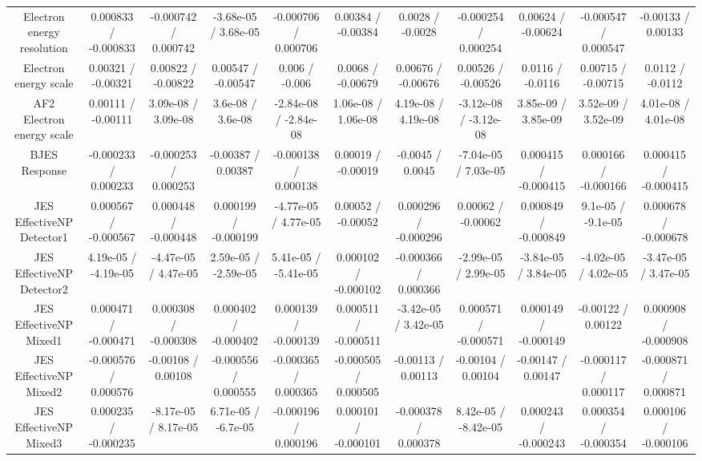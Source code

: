 \begin{table}[htbp]
\begin{center}
\begin{tabular}{|c|c|c|c|c|c|c|c|c|c|c|}
  Electron energy resolution & 0.000833 / -0.000833 & -0.000742 / 0.000742 & -3.68e-05 / 3.68e-05 & -0.000706 / 0.000706 & 0.00384 / -0.00384 & 0.0028 / -0.0028 & -0.000254 / 0.000254 & 0.00624 / -0.00624 & -0.000547 / 0.000547 & -0.00133 / 0.00133 \\ 
  Electron energy scale & 0.00321 / -0.00321 & 0.00822 / -0.00822 & 0.00547 / -0.00547 & 0.006 / -0.006 & 0.0068 / -0.00679 & 0.00676 / -0.00676 & 0.00526 / -0.00526 & 0.0116 / -0.0116 & 0.00715 / -0.00715 & 0.0112 / -0.0112 \\ 
  AF2 Electron energy scale & 0.00111 / -0.00111 & 3.09e-08 / 3.09e-08 & 3.6e-08 / 3.6e-08 & -2.84e-08 / -2.84e-08 & 1.06e-08 / 1.06e-08 & 4.19e-08 / 4.19e-08 & -3.12e-08 / -3.12e-08 & 3.85e-09 / 3.85e-09 & 3.52e-09 / 3.52e-09 & 4.01e-08 / 4.01e-08 \\ 
  BJES Response & -0.000233 / 0.000233 & -0.000253 / 0.000253 & -0.00387 / 0.00387 & -0.000138 / 0.000138 & 0.00019 / -0.00019 & -0.0045 / 0.0045 & -7.04e-05 / 7.03e-05 & 0.000415 / -0.000415 & 0.000166 / -0.000166 & 0.000415 / -0.000415 \\ 
  JES EffectiveNP Detector1 & 0.000567 / -0.000567 & 0.000448 / -0.000448 & 0.000199 / -0.000199 & -4.77e-05 / 4.77e-05 & 0.00052 / -0.00052 & 0.000296 / -0.000296 & 0.00062 / -0.00062 & 0.000849 / -0.000849 & 9.1e-05 / -9.1e-05 & 0.000678 / -0.000678 \\ 
  JES EffectiveNP Detector2 & 4.19e-05 / -4.19e-05 & -4.47e-05 / 4.47e-05 & 2.59e-05 / -2.59e-05 & 5.41e-05 / -5.41e-05 & 0.000102 / -0.000102 & -0.000366 / 0.000366 & -2.99e-05 / 2.99e-05 & -3.84e-05 / 3.84e-05 & -4.02e-05 / 4.02e-05 & -3.47e-05 / 3.47e-05 \\ 
  JES EffectiveNP Mixed1 & 0.000471 / -0.000471 & 0.000308 / -0.000308 & 0.000402 / -0.000402 & 0.000139 / -0.000139 & 0.000511 / -0.000511 & -3.42e-05 / 3.42e-05 & 0.000571 / -0.000571 & 0.000149 / -0.000149 & -0.00122 / 0.00122 & 0.000908 / -0.000908 \\ 
  JES EffectiveNP Mixed2 & -0.000576 / 0.000576 & -0.00108 / 0.00108 & -0.000556 / 0.000555 & -0.000365 / 0.000365 & -0.000505 / 0.000505 & -0.00113 / 0.00113 & -0.00104 / 0.00104 & -0.00147 / 0.00147 & -0.000117 / 0.000117 & -0.000871 / 0.000871 \\ 
  JES EffectiveNP Mixed3 & 0.000235 / -0.000235 & -8.17e-05 / 8.17e-05 & 6.71e-05 / -6.7e-05 & -0.000196 / 0.000196 & 0.000101 / -0.000101 & -0.000378 / 0.000378 & 8.42e-05 / -8.42e-05 & 0.000243 / -0.000243 & 0.000354 / -0.000354 & 0.000106 / -0.000106 \\ 

\end{tabular}
\end{center}
\end{table}
